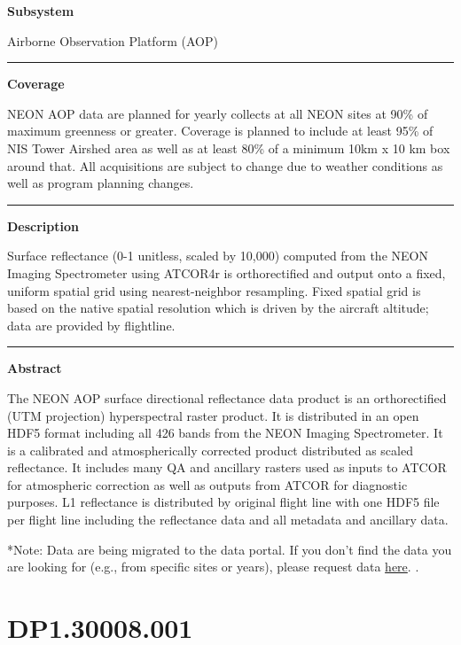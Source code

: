 \documentclass[]{article}
\begin{document}
\textbf{Subsystem}

Airborne Observation Platform (AOP)

\begin{center}\rule{0.5\linewidth}{\linethickness}\end{center}

\textbf{Coverage}

NEON AOP data are planned for yearly collects at all NEON sites at 90\%
of maximum greenness or greater. Coverage is planned to include at least
95\% of NIS Tower Airshed area as well as at least 80\% of a minimum
10km x 10 km box around that. All acquisitions are subject to change due
to weather conditions as well as program planning changes.

\begin{center}\rule{0.5\linewidth}{\linethickness}\end{center}

\textbf{Description}

Surface reflectance (0-1 unitless, scaled by 10,000) computed from the
NEON Imaging Spectrometer using ATCOR4r is orthorectified and output
onto a fixed, uniform spatial grid using nearest-neighbor resampling.
Fixed spatial grid is based on the native spatial resolution which is
driven by the aircraft altitude; data are provided by flightline.

\begin{center}\rule{0.5\linewidth}{\linethickness}\end{center}

\textbf{Abstract}

The NEON AOP surface directional reflectance data product is an
orthorectified (UTM projection) hyperspectral raster product. It is
distributed in an open HDF5 format including all 426 bands from the NEON
Imaging Spectrometer. It is a calibrated and atmospherically corrected
product distributed as scaled reflectance. It includes many QA and
ancillary rasters used as inputs to ATCOR for atmospheric correction as
well as outputs from ATCOR for diagnostic purposes. L1 reflectance is
distributed by original flight line with one HDF5 file per flight line
including the reflectance data and all metadata and ancillary data.

*Note: Data are being migrated to the data portal. If you don't find the
data you are looking for (e.g., from specific sites or years), please
request data
\href{http://www.neonscience.org/request-airborne-data}{here}. \newpage
.

\section{DP1.30008.001}\label{dp1.30008.001}
\end{document}
